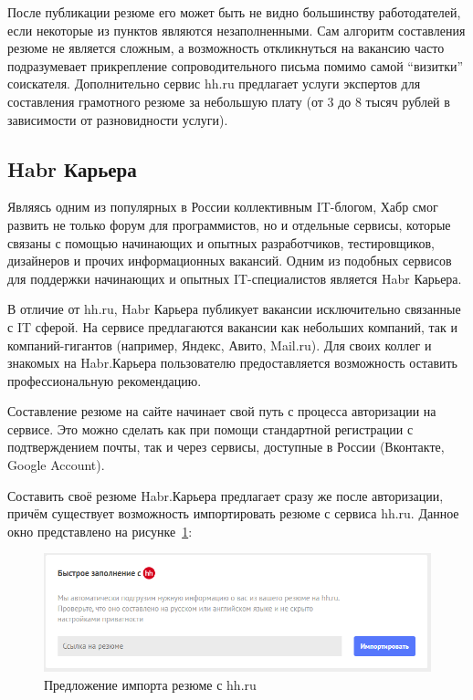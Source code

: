 \documentclass[master, och, pract]{SCWorks}
\begin{document}
После публикации резюме его может быть не видно большинству работодателей, 
если некоторые из пунктов являются незаполненными. Сам алгоритм составления резюме 
не является сложным, а возможность откликнуться на вакансию часто подразумевает 
прикрепление сопроводительного письма помимо самой “визитки” соискателя.
Дополнительно сервис hh.ru предлагает услуги экспертов для составления грамотного 
резюме за небольшую плату (от 3 до 8 тысяч рублей в зависимости от разновидности услуги).

\subsection{Habr Карьера}
Являясь одним из популярных в России коллективным IT-блогом, Хабр смог развить не только 
форум для программистов, но и отдельные сервисы, которые связаны с помощью начинающих 
и опытных разработчиков, тестировщиков, дизайнеров и прочих информационных вакансий. 
Одним из подобных сервисов для поддержки начинающих и опытных IT-специалистов является 
Habr Карьера.

В отличие от hh.ru, Habr Карьера публикует вакансии исключительно связанные с IT сферой. 
На сервисе предлагаются вакансии как небольших компаний, так и компаний-гигантов 
(например, Яндекс, Авито, Mail.ru). Для своих коллег и знакомых на Habr.Карьера 
пользователю предоставляется возможность оставить профессиональную рекомендацию.

Составление резюме на сайте начинает свой путь с процесса авторизации на сервисе. 
Это можно сделать как при помощи стандартной регистрации с подтверждением почты, 
так и через сервисы, доступные в России (Вконтакте, Google Account).

Составить своё резюме Habr.Карьера предлагает сразу же после авторизации, 
причём существует возможность импортировать резюме с сервиса hh.ru. Данное окно 
представлено на рисунке~\ref{fig:5}:
\begin{figure}[!ht]
    \centering
    \includegraphics[width=12cm]{images/image9.png}
    \caption{\label{fig:5}%
        Предложение импорта резюме с hh.ru}
\end{figure}
\end{document}
